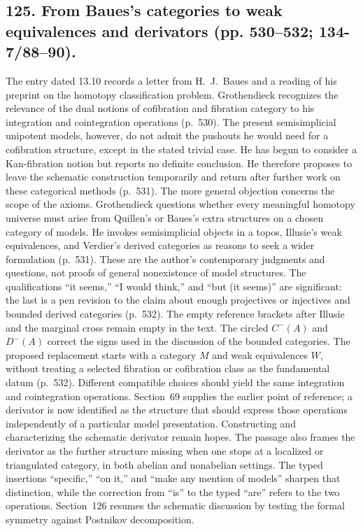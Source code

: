 \documentclass[10pt,oneside]{book}
\begin{document}
\subsection*{125. From Baues's categories to weak equivalences and derivators (pp. 530--532; 134-7/88--90).}
The entry dated 13.10 records a letter from H.~J.~Baues and a reading of his preprint on the homotopy classification problem. Grothendieck recognizes the relevance of the dual notions of cofibration and fibration category to his integration and cointegration operations (p.~530). The present semisimplicial unipotent models, however, do not admit the pushouts he would need for a cofibration structure, except in the stated trivial case. He has begun to consider a Kan-fibration notion but reports no definite conclusion. He therefore proposes to leave the schematic construction temporarily and return after further work on these categorical methods (p.~531). The more general objection concerns the scope of the axioms. Grothendieck questions whether every meaningful homotopy universe must arise from Quillen's or Baues's extra structures on a chosen category of models. He invokes semisimplicial objects in a topos, Illusie's weak equivalences, and Verdier's derived categories as reasons to seek a wider formulation (p.~531). These are the author's contemporary judgments and questions, not proofs of general nonexistence of model structures. The qualifications ``it seems,'' ``I would think,'' and ``but (it seems)'' are significant: the last is a pen revision to the claim about enough projectives or injectives and bounded derived categories (p.~532). The empty reference brackets after Illusie and the marginal cross remain empty in the text. The circled $C^{-}(A)$ and $D^{-}(A)$ correct the signs used in the discussion of the bounded categories. The proposed replacement starts with a category $M$ and weak equivalences $W$, without treating a selected fibration or cofibration class as the fundamental datum (p.~532). Different compatible choices should yield the same integration and cointegration operations. Section~69 supplies the earlier point of reference; a derivator is now identified as the structure that should express those operations independently of a particular model presentation. Constructing and characterizing the schematic derivator remain hopes. The passage also frames the derivator as the further structure missing when one stops at a localized or triangulated category, in both abelian and nonabelian settings. The typed insertions ``specific,'' ``on it,'' and ``make any mention of models'' sharpen that distinction, while the correction from ``is'' to the typed ``are'' refers to the two operations. Section~126 resumes the schematic discussion by testing the formal symmetry against Postnikov decomposition.
\end{document}
